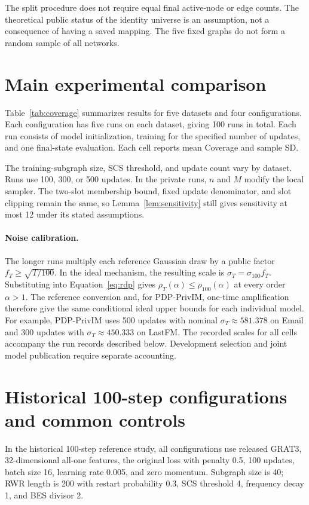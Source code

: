 The split procedure does not require equal final active-node or edge counts. The theoretical public status of the identity universe is an assumption, not a consequence of having a saved mapping. The five fixed graphs do not form a random sample of all networks.

\section{Main experimental comparison}\label{sec:main-experiment}
Table~\ref{tab:coverage} summarizes results for five datasets and four configurations. Each configuration has five runs on each dataset, giving 100 runs in total. Each run consists of model initialization, training for the specified number of updates, and one final-state evaluation. Each cell reports mean Coverage and sample SD.

The training-subgraph size, SCS threshold, and update count vary by dataset. Runs use 100, 300, or 500 updates. In the private runs, $n$ and $M$ modify the local sampler. The two-slot membership bound, fixed update denominator, and slot clipping remain the same, so Lemma~\ref{lem:sensitivity} still gives sensitivity at most 12 under its stated assumptions.

\paragraph{Noise calibration.}
The longer runs multiply each reference Gaussian draw by a public factor $f_T\geq\sqrt{T/100}$. In the ideal mechanism, the resulting scale is $\sigma_T=\sigma_{100}f_T$. Substituting into Equation~\eqref{eq:rdp} gives $\rho_T(\alpha)\leq\rho_{100}(\alpha)$ at every order $\alpha>1$. The reference conversion and, for PDP-PrivIM, one-time amplification therefore give the same conditional ideal upper bounds for each individual model. For example, PDP-PrivIM uses 500 updates with nominal $\sigma_T\approx581.378$ on Email and 300 updates with $\sigma_T\approx450.333$ on LastFM. The recorded scales for all cells accompany the run records described below. Development selection and joint model publication require separate accounting.

\section{Historical 100-step configurations and common controls}
In the historical 100-step reference study, all configurations use released GRAT3, 32-dimensional all-one features, the original loss with penalty 0.5, 100 updates, batch size 16, learning rate 0.005, and zero momentum. Subgraph size is 40; RWR length is 200 with restart probability 0.3, SCS threshold 4, frequency decay 1, and BES divisor 2.


